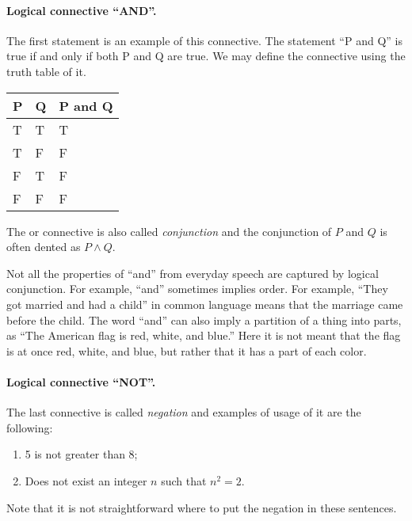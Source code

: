\paragraph{Logical connective ``AND''.}
The first statement is an example of this connective. The statement ``P and Q''
is true if and only if both P and Q are true. We may define the
connective using the truth table of it.
\begin{center}
  \begin{tabular}{l l l}
      \toprule
      P & Q & P and Q \\
      \midrule
      T & T & T \\
      T & F & F \\
      F & T & F \\
      F & F & F \\
      \bottomrule
  \end{tabular}
\end{center}

The or connective is also called \emph{conjunction} and the conjunction of
$P$ and $Q$ is often dented as $P \land Q$.


\begin{warning}
  Not all the properties of ``and'' from everyday speech are captured by
  logical conjunction. For example, ``and'' sometimes implies order. For
  example, ``They got married and had a child'' in common language means that
  the marriage came before the child. The word ``and'' can also imply a
  partition of a thing into parts, as ``The American flag is red, white, and
  blue.'' Here it is not meant that the flag is at once red, white, and blue,
  but rather that it has a part of each color.
\end{warning}

\paragraph{Logical connective ``NOT''.}
The last connective is called \emph{negation} and examples of usage of it are
the following:
\begin{enumerate}
  \item 5 is not greater than 8;
  \item Does not exist an integer $n$ such that $n^2 = 2$.
\end{enumerate}

Note that it is not straightforward where to put the negation in these
sentences.

